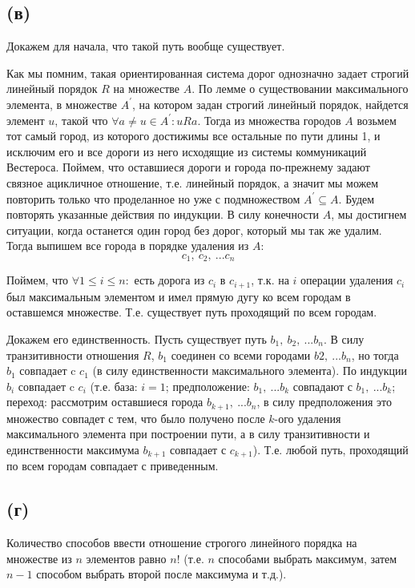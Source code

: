 \documentclass{article}
\begin{document}
	\subsection {(в)}
	Докажем для начала, что такой путь вообще существует.
	 
	Как мы помним, такая ориентированная система дорог однозначно задает строгий линейный порядок $R$ на множестве $A$. По лемме о существовании максимального элемента, в множестве $A^{\prime}$, на котором задан строгий линейный порядок, найдется элемент $u$,  такой что $\forall a \ne u \in A^{\prime}: u R a$. Тогда из множества городов $A$ возьмем тот самый город, из которого достижимы все остальные по пути длины 1, и исключим его и все дороги из него исходящие из системы коммуникаций Вестероса. Поймем, что оставшиеся дороги и города по-прежнему задают связное ацикличное отношение, т.е. линейный порядок, а значит мы можем повторить только что проделанное но уже с подмножеством $A^{\prime} \subseteq A$. Будем повторять указанные действия по индукции. В силу конечности $A$, мы достигнем ситуации, когда останется один город без дорог, который мы так же удалим. Тогда выпишем все города в порядке удаления из $A$: 
		$$c_1,\ c_2,\ ...c_n$$
	
	Поймем, что $\forall 1 \leq i \leq n:$ есть дорога из $c_i$ в $c_{i + 1}$, т.к. на $i$ операции удаления $c_i$ был максимальным элементом и имел прямую дугу ко всем городам в оставшемся множестве. Т.е. существует путь проходящий по всем городам.
	
	Докажем его единственность. Пусть существует путь $b_1,\ b_2,\ ...b_n$. В силу транзитивности отношения $R$, $b_1$ соединен со всеми городами $b2,\ ...b_n$, но тогда $b_1$ совпадает c $c_1$ (в силу единственности максимального элемента). По индукции $b_i$ совпадает c $c_i$ (т.е. база: $i = 1$; предположение: $b_1,\ ... b_k$ совпадают с $b_1,\ ... b_k$; переход: рассмотрим оставшиеся города $b_{k + 1},\ ...b_n$, в силу предположения это множество совпадет с тем, что было получено после $k$-ого удаления максимального элемента при построении пути, а в силу транзитивности и единственности максимума $b_{k + 1}$ совпадает с $c_{k + 1}$). Т.е. любой путь, проходящий по всем городам совпадает с приведенным.  
	\subsection {(г)} Количество способов ввести отношение строгого линейного порядка на множестве из $n$ элементов равно $n!$ (т.е. $n$ способами выбрать максимум, затем $n - 1$ способом выбрать второй после максимума и т.д.).
	
\end{document}
